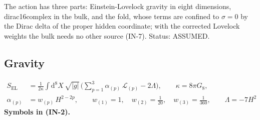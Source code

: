 \documentclass[
  10pt,
]{article}
\begin{document}
The action has three parts: Einstein-Lovelock gravity in eight
dimensions, dirac16complex in the bulk, and the fold, whose terms are
confined to \(\sigma = 0\) by the Dirac delta of the proper hidden
coordinate; with the corrected Lovelock weights the bulk needs no other
source (IN-7). Status: ASSUMED.

\hypertarget{gravity}{%
\subsection{Gravity}\label{gravity}}

\[
\begin{aligned}
S_{\mathrm{EL}} &= \frac{1}{2\kappa}\int\mathrm{d}^8X\,\sqrt{\lvert g\rvert}\,\Big(\sum_{p=1}^{3}\alpha_{(p)}\,\mathcal{L}_{(p)}
 - 2\Lambda\Big),\qquad \kappa = 8\pi G_8,\\
\alpha_{(p)} &= w_{(p)}\,H^{2-2p},\qquad w_{(1)} = 1,\quad w_{(2)} = \frac{1}{20},\quad w_{(3)} = \frac{1}{360},
 \qquad \Lambda = -7H^2
\end{aligned} \tag{IN-2}
\] \textbf{Symbols in (IN-2).}
\end{document}
